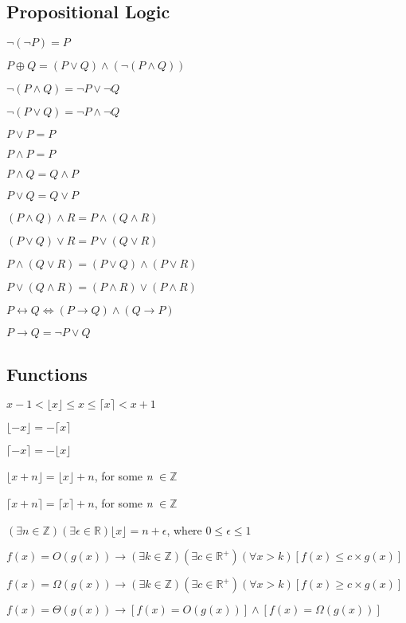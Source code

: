 \subsection{Propositional Logic}
\begin{symbollist}
    \item $\neg (\neg P) = P$
    \item $P \oplus Q = (P \vee Q) \wedge (\neg(P \wedge Q))$
    \item $\neg(P \wedge Q) = \neg P \vee \neg Q$
    \item $\neg(P \vee Q) = \neg P \wedge \neg Q$
    \item $P \vee P = P$
    \item $P \wedge P = P$
    \item $P \wedge Q = Q \wedge P$
    \item $P \vee Q = Q \vee P$
    \item $(P \wedge Q) \wedge R = P \wedge (Q \wedge R)$
    \item $(P \vee Q) \vee R = P \vee (Q \vee R)$
    \item $P \wedge (Q \vee R) = (P \vee Q) \wedge (P \vee R)$
    \item $P \vee (Q \wedge R) = (P \wedge R) \vee (P \wedge R)$
    \item $P \leftrightarrow Q \Leftrightarrow (P \rightarrow Q) \wedge (Q
    \rightarrow P)$
    \item $P \rightarrow Q = \neg P \vee Q$
\end{symbollist}

\subsection{Functions}
\begin{symbollist}
    \item $ x - 1 < \lfloor x \rfloor \leq x \leq \lceil x \rceil < x + 1$
    \item $ \lfloor - x \rfloor = - \lceil x \rceil$
    \item $ \lceil -x \rceil = - \lfloor x \rfloor$
    \item $ \lfloor x + n \rfloor = \lfloor x \rfloor + n$, for some \emph{n}
        $\in \mathbb{Z}$
    \item $ \lceil x + n \rceil = \lceil x \rceil + n$, for some \emph{n} $\in
        \mathbb{Z}$
    \item $(\exists n \in \mathbb{Z})(\exists \epsilon \in \mathbb{R}) \lfloor
        x \rfloor = n + \epsilon$, where $ 0 \leq \epsilon \leq 1$
    \item $f(x) = O(g(x)) \rightarrow (\exists k \in \mathbb{Z})(\exists c \in
        \mathbb{R^{+}})(\forall x > k)[f(x) \leq c \times g(x)]$
    \item $f(x) = \Omega(g(x)) \rightarrow (\exists k \in \mathbb{Z})(\exists c \in
        \mathbb{R^{+}})(\forall x > k)[f(x) \geq c \times g(x)]$
    \item $f(x) = \Theta(g(x)) \rightarrow [f(x) = O(g(x))] \wedge [f(x) =
        \Omega(g(x))]$
\end{symbollist}

